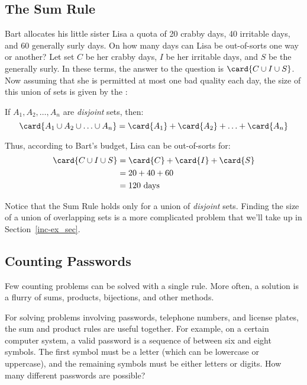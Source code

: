 \subsection{The Sum Rule}

Bart allocates his little sister Lisa a quota of 20 crabby days, 40
irritable days, and 60 generally surly days.  On how many days can
Lisa be out-of-sorts one way or another?  Let set $C$ be her crabby
days, $I$ be her irritable days, and $S$ be the generally surly.  In
these terms, the answer to the question is $\card{C \cup I \cup S}$.
Now assuming that she is permitted at most one bad quality each day,
the size of this union of sets is given by the :

\begin{rul}\label{rul:sum}
If $A_1, A_2, \ldots, A_n$ are \emph{disjoint} sets, then:
%
\[
\card{A_1 \cup A_2 \cup \ldots \cup A_n}
    = \card{A_1} + \card{A_2} + \ldots + \card{A_n}
\]
\end{rul}

Thus, according to Bart's budget, Lisa can be out-of-sorts for:
%
\begin{align*}
\card{C \cup I \cup S}
    & = \card{C} + \card{I} + \card{S} \\
    & = 20 + 40 + 60 \\
    & = 120 \text{ days}
\end{align*}

Notice that the Sum Rule holds only for a union of \emph{disjoint}
sets.  Finding the size of a union of overlapping sets is a more
complicated problem that we'll take up in Section~\ref{inc-ex_sec}.

\subsection{Counting Passwords}

Few counting problems can be solved with a single rule.  More often, a
solution is a flurry of sums, products, bijections, and other methods.

For solving problems involving passwords, telephone numbers, and
license plates, the sum and product rules are useful together.  For
example, on a certain computer system, a valid password is a sequence
of between six and eight symbols.  The first symbol must be a letter
(which can be lowercase or uppercase), and the remaining symbols must
be either letters or digits.  How many different passwords are
possible?

